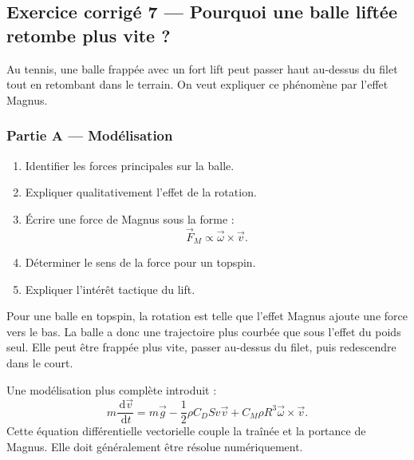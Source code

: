 \documentclass[11pt,a4paper]{article}
\newcommand{\dd}{\,\mathrm d}
\begin{document}
\subsection{Exercice corrigé 7 — Pourquoi une balle liftée retombe plus vite ?}

\begin{exercicebox}
Au tennis, une balle frappée avec un fort lift peut passer haut au-dessus du filet tout en retombant dans le terrain. On veut expliquer ce phénomène par l'effet Magnus.
\end{exercicebox}

\subsubsection*{Partie A — Modélisation}

\begin{enumerate}
  \item Identifier les forces principales sur la balle.
  \item Expliquer qualitativement l'effet de la rotation.
  \item Écrire une force de Magnus sous la forme :
  \[
  \vec F_M\propto \vec\omega\times\vec v.
  \]
  \item Déterminer le sens de la force pour un topspin.
  \item Expliquer l'intérêt tactique du lift.
\end{enumerate}

\begin{corrigebox}
Pour une balle en topspin, la rotation est telle que l'effet Magnus ajoute une force vers le bas. La balle a donc une trajectoire plus courbée que sous l'effet du poids seul. Elle peut être frappée plus vite, passer au-dessus du filet, puis redescendre dans le court.
\end{corrigebox}

\begin{approfondissementbox}
Une modélisation plus complète introduit :
\[
m\frac{\dd \vec v}{\dd t}
=
m\vec g
-\frac12\rho C_D S v\vec v
+
C_M\rho R^3\vec\omega\times\vec v.
\]
Cette équation différentielle vectorielle couple la traînée et la portance de Magnus. Elle doit généralement être résolue numériquement.
\end{approfondissementbox}

\end{document}
